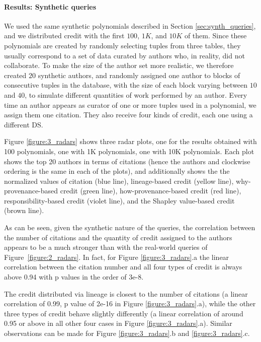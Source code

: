 \documentclass[preprint,12pt,sort&compress]{elsarticle}
\newcommand{\rtwo}[1]{\textcolor{reviewer2}{#1}}
\newcommand{\eat}[1]{}
\begin{document}
\paragraph{Results: Synthetic queries}
We used the same synthetic polynomials described in Section \ref{sec:synth_queries}, and we distributed credit with the first $100$, $1K$, and $10K$ of them.
Since these polynomials are created by randomly selecting tuples from three tables, they usually correspond to a set of data curated by  authors who, in reality, did not collaborate. To make the size of the author set more realistic, we therefore created $20$ synthetic authors, and randomly assigned one author to blocks of consecutive tuples in the database, with the size of each block varying between $10$ and $40$, to simulate different quantities of work performed by an author. 
Every time an author appears as curator of one or more tuples used in a polynomial, we assign them one citation.  
They also receive four kinds of credit, each one using a different DS.

Figure \ref{figure:3_radars} shows three radar plots, one for the results obtained with 100 polynomials, one with 1K polynomials, one with 10K polynomials.  
Each plot shows the top 20 authors in terms of citations (hence the authors and clockwise ordering is the same in each of the plots), and additionally shows the the normalized values of citation (blue line), lineage-based credit (yellow line), why-provenance-based credit (green line), how-provenance-based  credit (red line), \rtwo{responsibility-based credit (violet line), and the Shapley value-based credit (brown line)}. 

As can be seen, given the synthetic nature of the queries, the correlation between the number of citations and the quantity of credit assigned to the authors appears to be a much stronger than with the real-world queries of Figure~\ref{figure:2_radars}. In fact, for Figure \ref{figure:3_radars}.a  the linear correlation between the citation number and all four types of credit is always above 0.94 with p values in the order of 3e-8.
\eat{Nonetheless, it can still be seen that credit does not always follow the citation count. }
The credit distributed via lineage is closest to  the number of citations (a linear correlation of 0.99, p value of 2e-16 in Figure \ref{figure:3_radars}.a), while the other three types of credit behave slightly differently (a linear correlation of around 0.95 or above in all other four cases in Figure \ref{figure:3_radars}.a).  
Similar observations can be made for Figure \ref{figure:3_radars}.b and \ref{figure:3_radars}.c.
\end{document}
